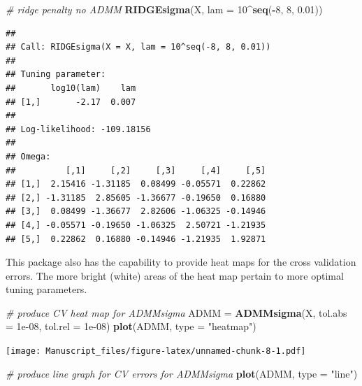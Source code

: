 \documentclass[11pt,]{book}
\newenvironment{Shaded}{\begin{snugshade}}{\end{snugshade}}
\newcommand{\CommentTok}[1]{\textcolor[rgb]{0.56,0.35,0.01}{\textit{#1}}}
\newcommand{\DataTypeTok}[1]{\textcolor[rgb]{0.13,0.29,0.53}{#1}}
\newcommand{\DecValTok}[1]{\textcolor[rgb]{0.00,0.00,0.81}{#1}}
\newcommand{\FloatTok}[1]{\textcolor[rgb]{0.00,0.00,0.81}{#1}}
\newcommand{\KeywordTok}[1]{\textcolor[rgb]{0.13,0.29,0.53}{\textbf{#1}}}
\newcommand{\NormalTok}[1]{#1}
\newcommand{\OperatorTok}[1]{\textcolor[rgb]{0.81,0.36,0.00}{\textbf{#1}}}
\newcommand{\StringTok}[1]{\textcolor[rgb]{0.31,0.60,0.02}{#1}}
\theoremstyle{definition}
\theoremstyle{definition}
\theoremstyle{definition}
\theoremstyle{remark}
\begin{document}
\begin{Shaded}
\begin{Highlighting}[]
\CommentTok{# ridge penalty no ADMM}
\KeywordTok{RIDGEsigma}\NormalTok{(X, }\DataTypeTok{lam =} \DecValTok{10}\OperatorTok{^}\KeywordTok{seq}\NormalTok{(}\OperatorTok{-}\DecValTok{8}\NormalTok{, }\DecValTok{8}\NormalTok{, }\FloatTok{0.01}\NormalTok{))}
\end{Highlighting}
\end{Shaded}

\begin{verbatim}
## 
## Call: RIDGEsigma(X = X, lam = 10^seq(-8, 8, 0.01))
## 
## Tuning parameter:
##       log10(lam)    lam
## [1,]       -2.17  0.007
## 
## Log-likelihood: -109.18156
## 
## Omega:
##          [,1]     [,2]     [,3]     [,4]     [,5]
## [1,]  2.15416 -1.31185  0.08499 -0.05571  0.22862
## [2,] -1.31185  2.85605 -1.36677 -0.19650  0.16880
## [3,]  0.08499 -1.36677  2.82606 -1.06325 -0.14946
## [4,] -0.05571 -0.19650 -1.06325  2.50721 -1.21935
## [5,]  0.22862  0.16880 -0.14946 -1.21935  1.92871
\end{verbatim}

\newpage

This package also has the capability to provide heat maps for the cross
validation errors. The more bright (white) areas of the heat map pertain
to more optimal tuning parameters.

\vspace{0.5cm}

\begin{Shaded}
\begin{Highlighting}[]
\CommentTok{# produce CV heat map for ADMMsigma}
\NormalTok{ADMM =}\StringTok{ }\KeywordTok{ADMMsigma}\NormalTok{(X, }\DataTypeTok{tol.abs =} \FloatTok{1e-08}\NormalTok{, }\DataTypeTok{tol.rel =} \FloatTok{1e-08}\NormalTok{)}
\KeywordTok{plot}\NormalTok{(ADMM, }\DataTypeTok{type =} \StringTok{"heatmap"}\NormalTok{)}
\end{Highlighting}
\end{Shaded}

\texttt{[image: Manuscript\_files/figure-latex/unnamed-chunk-8-1.pdf]}
\newpage

\begin{Shaded}
\begin{Highlighting}[]
\CommentTok{# produce line graph for CV errors for ADMMsigma}
\KeywordTok{plot}\NormalTok{(ADMM, }\DataTypeTok{type =} \StringTok{"line"}\NormalTok{)}
\end{Highlighting}
\end{Shaded}
\end{document}
